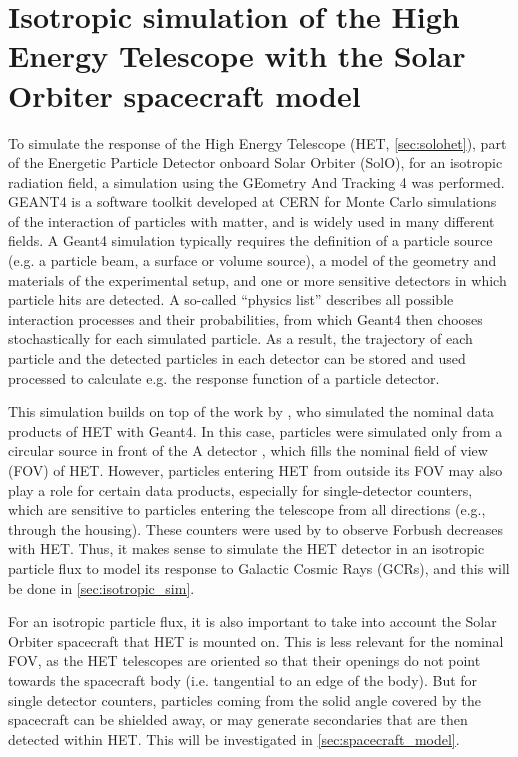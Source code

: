 \chapter{Isotropic simulation of the High Energy Telescope with the Solar Orbiter spacecraft model}
\label{chp:HETSimulation}

To simulate the response of the High Energy Telescope (HET, \autoref{sec:solohet}), part of the Energetic Particle Detector \citep[EPD][]{RodriguezPacheco-2019-EPD} onboard Solar Orbiter (SolO), for an isotropic radiation field, a simulation using the GEometry And Tracking 4 \citep[Geant4][]{Agostinelli-2003} was performed. GEANT4 is a software toolkit developed at CERN for Monte Carlo simulations of the interaction of particles with matter, and is widely used in many different fields. A Geant4 simulation typically requires the definition of a particle source (e.g. a particle beam, a surface or volume source), a model of the geometry and materials of the experimental setup, and one or more sensitive detectors in which particle hits are detected. A so-called ``physics list'' describes all possible interaction processes and their probabilities, from which Geant4 then chooses stochastically for each simulated particle. As a result, the trajectory of each particle and the detected particles in each detector can be stored and used processed to calculate e.g. the response function of a particle detector.

This simulation builds on top of the work by \citet{Elftmann-2020-PhD}, who simulated the nominal data products of HET with Geant4. In this case, particles were simulated only from a circular source in front of the A detector \citet[Figure 5.1]{Elftmann-2020-PhD}, which fills the nominal field of view (FOV) of HET. However, particles entering HET from outside its FOV may also play a role for certain data products, especially for single-detector counters, which are sensitive to particles entering the telescope from all directions (e.g., through the housing). These counters were used by \citet{Forstner-2021-SolO} to observe Forbush decreases with HET. Thus, it makes sense to simulate the HET detector in an isotropic particle flux to model its response to Galactic Cosmic Rays (GCRs), and this will be done in \autoref{sec:isotropic_sim}.

For an isotropic particle flux, it is also important to take into account the Solar Orbiter spacecraft that HET is mounted on. This is less relevant for the nominal FOV, as the HET telescopes are oriented so that their openings do not point towards the spacecraft body (i.e. tangential to an edge of the body). But for single detector counters, particles coming from the solid angle covered by the spacecraft can be shielded away, or may generate secondaries that are then detected within HET. This will be investigated in \autoref{sec:spacecraft_model}.

